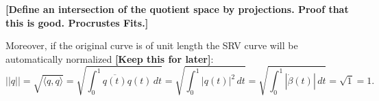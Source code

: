 \textbf{[Define an intersection of the quotient space by projections. Proof that this is good. Procrustes Fits.]}

Moreover, if the original curve is of unit length the SRV curve will be automatically normalized \textbf{[Keep this for later]}:
$$ ||q|| = \sqrt{\langle q, q \rangle} = \sqrt{ \int_0^1 \overline{q(t)} q(t) \, dt } = \sqrt{ \int_0^1 |q(t)|^2 \, dt} = \sqrt{\int_0^1 |\dot{\beta}(t)| \, dt} = \sqrt{1} = 1. $$

